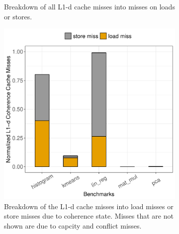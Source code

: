 \begin{figure}[htbp]
\begin{subfigure}{0.33\textwidth}
		\caption{Breakdown of all L1-d cache misses into misses on loads or stores.}
	\end{subfigure}
	\begin{subfigure}{0.33\textwidth}
		\centering
		\includegraphics[scale=0.4]{graphs/coherence_misses_L1.pdf}
		\caption{Breakdown of the L1-d cache misses into load misses or store misses due to coherence state. Misses that are not shown are due to capcity and conflict misses.}
	\end{subfigure}
\caption{} %
\label{fig:L1_misses}
\end{figure}




